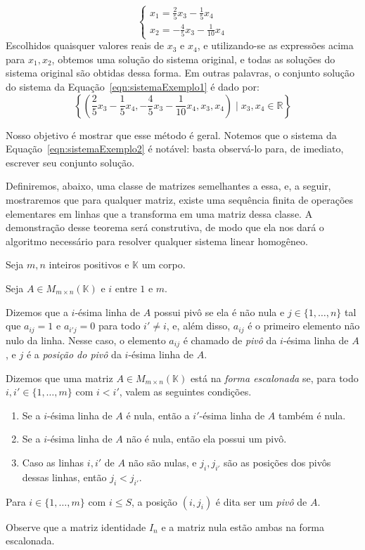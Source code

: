 \begin{equation*}
    \begin{cases}
        x_1 = \frac{2}{5}x_3 - \frac{1}{5}x_4 \\
        x_2 = -\frac{4}{5}x_3 - \frac{1}{10}x_4
    \end{cases}
\end{equation*}
Escolhidos quaisquer valores reais de $x_3$ e $x_4$, e utilizando-se as expressões acima para $x_1, x_2$, obtemos uma solução do sistema original, e todas as soluções do sistema original são obtidas dessa forma.
Em outras palavras, o conjunto solução do sistema da Equação~\eqref{eqn:sistemaExemplo1} é dado por:
\begin{equation*}
    \left\{\left(\frac{2}{5}x_3 - \frac{1}{5}x_4, -\frac{4}{5}x_3 - \frac{1}{10}x_4, x_3, x_4\right) \mid x_3, x_4 \in \mathbb R\right\}
\end{equation*}

Nosso objetivo é mostrar que esse método é geral.
Notemos que o sistema da Equação~\eqref{eqn:sistemaExemplo2} é notável: basta observá-lo para, de imediato, escrever seu conjunto solução.

Definiremos, abaixo, uma classe de matrizes semelhantes a essa, e, a seguir, mostraremos que para qualquer matriz, existe uma sequência finita de operações elementares em linhas que a transforma em uma matriz dessa classe.
A demonstração desse teorema será construtiva, de modo que ela nos dará o algoritmo necessário para resolver qualquer sistema linear homogêneo.

\begin{definition}
    Seja $m, n$ inteiros positivos e $\mathbb K$ um corpo.

    Seja $A \in M_{m \times n}(\mathbb K)$ e $i$ entre $1$ e $m$.

    Dizemos que a $i$-ésima linha de $A$ possui pivô se ela é não nula e $j \in \{1, \ldots, n\}$ tal que $a_{ij}=1$ e $a_{i'j}=0$ para todo $i'\neq i$, e, além disso, $a_{ij}$ é o primeiro elemento não nulo da linha.
    Nesse caso, o elemento $a_{ij}$ é chamado de \emph{pivô} da $i$-ésima linha de $A$, e $j$ é a \emph{posição do pivô} da $i$-ésima linha de $A$.
    

    Dizemos que uma matriz $A\in M_{m \times n}(\mathbb K)$ está na \emph{forma escalonada} se, para todo $i, i' \in \{1, \ldots, m\}$ com $i<i'$, valem as seguintes condições.
    \begin{enumerate}[label=\alph*)]
        \item Se a $i$-ésima linha de $A$ é nula, então a $i'$-ésima linha de $A$ também é nula.
        \item Se a $i$-ésima linha de $A$ não é nula, então ela possui um pivô.
        \item Caso as linhas $i, i'$ de $A$ não são nulas, e $j_i, j_{i'}$ são as posições dos pivôs dessas linhas, então $j_i < j_{i'}$.
    \end{enumerate}

    Para $i \in \{1, \ldots, m\}$ com $i\leq S$, a posição $(i, j_i)$ é dita ser um \emph{pivô} de $A$.
\end{definition}
Observe que a matriz identidade $I_n$ e a matriz nula estão ambas na forma escalonada.


